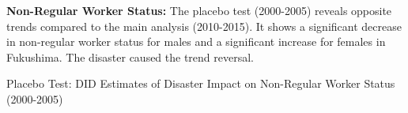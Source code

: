 \documentclass[serif, aspectratio=169]{beamer}
\newcommand{\returnbutton}[2]{%
  \vspace{-1.0cm}  %
  \hfill  %
  \hyperlink{#1}{%
    {\footnotesize\beamerbutton{#2}}%
  }%
  \vspace{0.3cm}  %
}
\begin{document}
\begin{frame}[label=nonregular_placebo]

\textbf{Non-Regular Worker Status:} The placebo test (2000-2005) reveals opposite trends compared to the main analysis (2010-2015). It shows a significant decrease in non-regular worker status for males and a significant increase for females in Fukushima. The disaster caused the trend reversal.

\vspace{-1.0cm}
\returnbutton{nonregular_status}{Return}
\vspace{1.2cm}

\begin{table}[htbp]
\centering
\caption{Placebo Test: DID Estimates of Disaster Impact on Non-Regular Worker Status (2000-2005)}

\vspace{-0.2cm}



\end{table}
\end{frame}
\end{document}
